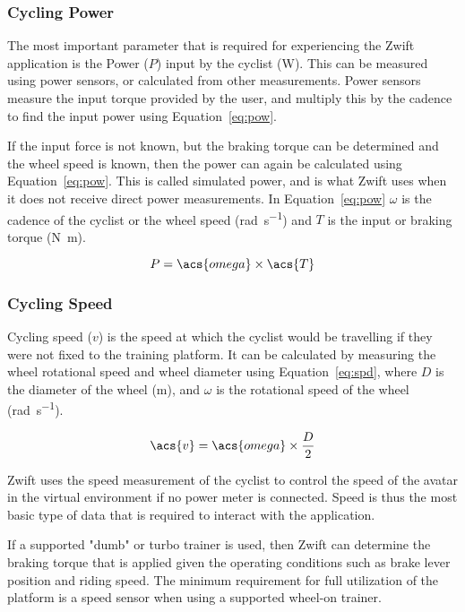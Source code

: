 \subsubsection{Cycling Power}
The most important parameter that is required for experiencing the Zwift application is the Power ($P$) input by the cyclist (\si{\watt}). This can be measured using power sensors, or calculated from other measurements. Power sensors measure the input torque provided by the user, and multiply this by the cadence to find the input power using Equation~\ref{eq:pow}. 

If the input force is not known, but the braking torque can be determined and the wheel speed is known, then the power can again be calculated using Equation~\ref{eq:pow}. This is called simulated power, and is what Zwift uses when it does not receive direct power measurements. In Equation~\ref{eq:pow} $\omega$ is the cadence of the cyclist or the wheel speed (\si{\radian\per\second}) and $T$ is the input or braking torque (\si{\newton\meter}). \citep[2022]{Zwift:2022}

\begin{equation}
	P = \acs{omega} \times \acs{T}
	\label{eq:pow}
\end{equation}

\subsubsection{Cycling Speed}
Cycling speed ($v$) is the speed at which the cyclist would be travelling if they were not fixed to the training platform. It can be calculated by measuring the wheel rotational speed and wheel diameter using Equation~\ref{eq:spd}, where $D$ is the diameter of the wheel (\si{\meter}), and $\omega$ is the rotational speed of the wheel (\si{\radian\per\second}).

\begin{equation}
	\acs{v} = \acs{omega} \times \frac{D}{2}
	\label{eq:spd}
\end{equation}

Zwift uses the speed measurement of the cyclist to control the speed of the avatar in the virtual environment if no power meter is connected. Speed is thus the most basic type of data that is required to interact with the application. 

If a supported "dumb" or turbo trainer is used, then Zwift can determine the braking torque that is applied given the operating conditions such as brake lever position and riding speed.
The minimum requirement for full utilization of the platform is a speed sensor when using a supported wheel-on trainer. \citep[2022]{Zwift:2022}

